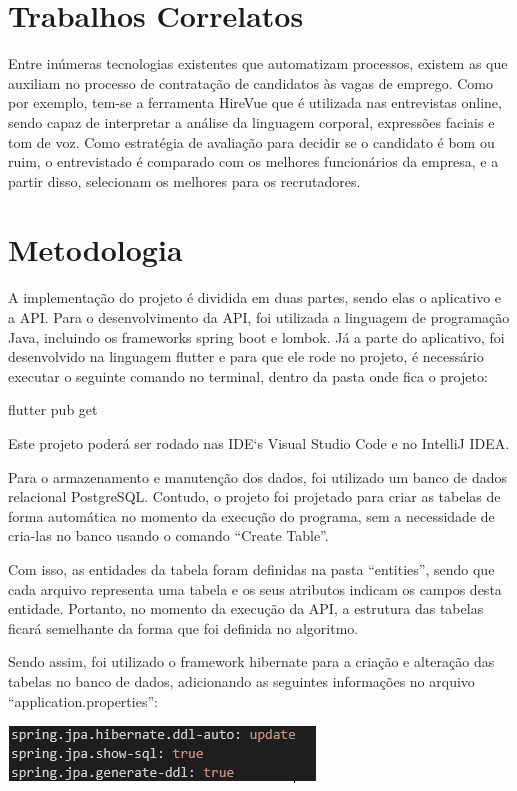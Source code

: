 \documentclass[conference]{IEEEtran}
\begin{document}
\section*{Trabalhos Correlatos}
Entre inúmeras tecnologias existentes que automatizam processos, existem as que auxiliam no processo de contratação de candidatos às vagas de emprego. Como por exemplo, tem-se a ferramenta HireVue que é utilizada nas entrevistas online, sendo capaz de interpretar a análise da linguagem corporal, expressões faciais e tom de voz. Como estratégia de avaliação para decidir se o candidato é bom ou ruim, o entrevistado é comparado com os melhores funcionários da empresa, e a partir disso, selecionam os melhores para os recrutadores.

\section*{Metodologia}
A implementação do projeto é dividida em duas partes, sendo elas o aplicativo e a API. Para o desenvolvimento da API, foi utilizada a linguagem de programação Java, incluindo os frameworks spring boot e lombok. Já a parte do aplicativo, foi desenvolvido na linguagem flutter e para que ele rode no projeto, é necessário executar o seguinte comando no terminal, dentro da pasta onde fica o projeto:

\vspace{3mm}
\centerline{flutter pub get}
\vspace{3mm}

Este projeto poderá ser rodado nas IDE`s Visual Studio Code e no IntelliJ IDEA.

Para o armazenamento e manutenção dos dados, foi utilizado um banco de dados relacional PostgreSQL. Contudo, o projeto foi projetado para criar as tabelas de forma automática no momento da execução do programa, sem a necessidade de cria-las no banco usando o comando “Create Table”.

Com isso, as entidades da tabela foram definidas na pasta “entities”, sendo que cada arquivo representa uma tabela e os seus atributos indicam os campos desta entidade. Portanto, no momento da execução da API, a estrutura das tabelas ficará semelhante da forma que foi definida no algoritmo.

Sendo assim, foi utilizado o framework hibernate para a criação e alteração das tabelas no banco de dados, adicionando as seguintes informações no arquivo “application.properties”:

\vspace{7mm}
\centerline{\includegraphics{AlgoritmoHibernate.png}}
\vspace{7mm}
\end{document}
